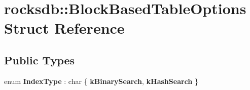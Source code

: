 \hypertarget{structrocksdb_1_1BlockBasedTableOptions}{}\section{rocksdb\+:\+:Block\+Based\+Table\+Options Struct Reference}
\label{structrocksdb_1_1BlockBasedTableOptions}
\subsection*{Public Types}
\begin{DoxyCompactItemize}
\item 
enum {\bfseries Index\+Type} \+: char \{ {\bfseries k\+Binary\+Search}, 
{\bfseries k\+Hash\+Search}
 \}\hypertarget{structrocksdb_1_1BlockBasedTableOptions_a93cf5570b2c1a10470db336b9d83e2ce}{}\label{structrocksdb_1_1BlockBasedTableOptions_a93cf5570b2c1a10470db336b9d83e2ce}

\end{DoxyCompactItemize}
